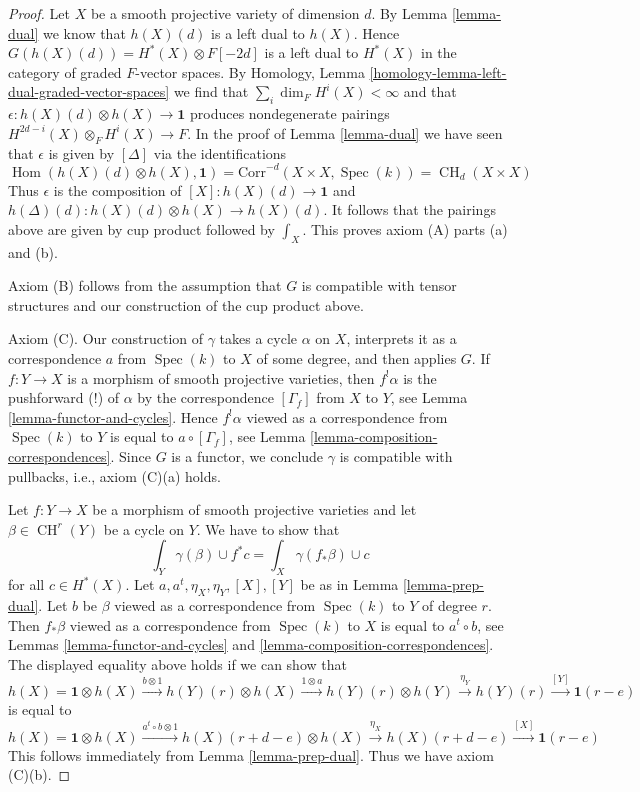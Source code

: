 \documentclass{stacks-project}
\theoremstyle{plain}
\theoremstyle{definition}
\theoremstyle{remark}
\numberwithin{equation}{subsection}
\def\Spec{\mathop{\mathrm{Spec}}}
\def\Hom{\mathop{\mathrm{Hom}}\nolimits}
\def\CH{\mathop{\mathrm{CH}}\nolimits}
\begin{document}
\begin{proof}
\medskip\noindent
Let $X$ be a smooth projective variety of dimension $d$.
By Lemma \ref{lemma-dual}
we know that $h(X)(d)$ is a left dual to $h(X)$. Hence
$G(h(X)(d)) = H^*(X) \otimes F[-2d]$ is a left dual to
$H^*(X)$ in the category of graded $F$-vector spaces.
By Homology, Lemma \ref{homology-lemma-left-dual-graded-vector-spaces}
we find that $\sum_i \dim_F H^i(X) < \infty$ and that
$\epsilon : h(X)(d) \otimes h(X) \to \mathbf{1}$ produces
nondegenerate pairings $H^{2d - i}(X) \otimes_F H^i(X) \to F$.
In the proof of Lemma \ref{lemma-dual} we have seen that
$\epsilon$ is given by $[\Delta]$ via the identifications
$$
\Hom(h(X)(d) \otimes h(X), \mathbf{1}) =
\text{Corr}^{-d}(X \times X, \Spec(k)) =
\CH_d(X \times X)
$$
Thus $\epsilon$ is the composition of $[X] : h(X)(d) \to \mathbf{1}$
and $h(\Delta)(d) : h(X)(d) \otimes h(X) \to h(X)(d)$. It follows
that the pairings above are given by cup product followed by
$\int_X$. This proves axiom (A) parts (a) and (b).

\medskip\noindent
Axiom (B) follows from the assumption that $G$ is compatible
with tensor structures and our construction of the cup product above.

\medskip\noindent
Axiom (C). Our construction of $\gamma$ takes a cycle $\alpha$ on $X$,
interprets it as a correspondence $a$ from $\Spec(k)$ to $X$ of some degree,
and then applies $G$. If $f : Y \to X$ is a morphism of smooth projective
varieties, then $f^!\alpha$ is the pushforward (!) of $\alpha$
by the correspondence $[\Gamma_f]$ from $X$ to $Y$, see
Lemma \ref{lemma-functor-and-cycles}. Hence
$f^!\alpha$ viewed as a correspondence from $\Spec(k)$ to $Y$
is equal to $a \circ [\Gamma_f]$, see
Lemma \ref{lemma-composition-correspondences}.
Since $G$ is a functor, we conclude
$\gamma$ is compatible with pullbacks, i.e., axiom (C)(a) holds.

\medskip\noindent
Let $f : Y \to X$ be a morphism of smooth projective varieties and
let $\beta \in \CH^r(Y)$ be a cycle on $Y$. We have to show that
$$
\int_Y \gamma(\beta) \cup f^*c = \int_X \gamma(f_*\beta) \cup c
$$
for all $c \in H^*(X)$. Let $a, a^t, \eta_X, \eta_Y, [X], [Y]$
be as in Lemma \ref{lemma-prep-dual}.
Let $b$ be $\beta$ viewed as a correspondence from $\Spec(k)$ to $Y$
of degree $r$. Then $f_*\beta$ viewed as a correspondence from
$\Spec(k)$ to $X$ is equal to $a^t \circ b$, see
Lemmas \ref{lemma-functor-and-cycles} and
\ref{lemma-composition-correspondences}.
The displayed equality above holds if we can show that
$$
h(X) = \mathbf{1} \otimes h(X)
\xrightarrow{b \otimes 1}
h(Y)(r) \otimes h(X)
\xrightarrow{1 \otimes a}
h(Y)(r) \otimes h(Y)
\xrightarrow{\eta_Y}
h(Y)(r)
\xrightarrow{[Y]}
\mathbf{1}(r - e)
$$
is equal to
$$
h(X) = \mathbf{1} \otimes h(X)
\xrightarrow{a^t \circ b \otimes 1}
h(X)(r + d - e) \otimes h(X)
\xrightarrow{\eta_X}
h(X)(r + d - e)
\xrightarrow{[X]}
\mathbf{1}(r - e)
$$
This follows immediately from Lemma \ref{lemma-prep-dual}.
Thus we have axiom (C)(b).


\end{proof}
\end{document}
